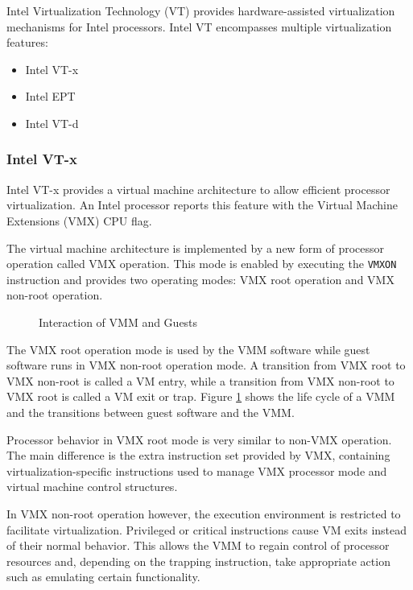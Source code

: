 Intel Virtualization Technology (VT) provides hardware-assisted
virtualization mechanisms for Intel processors. Intel VT encompasses multiple
virtualization features:
\begin{itemize}
	\item Intel VT-x
	\item Intel EPT
	\item Intel VT-d
\end{itemize}

\subsubsection{Intel VT-x}
Intel VT-x provides a virtual machine architecture to allow
efficient processor virtualization. An Intel processor reports this feature
with the Virtual Machine Extensions (VMX) CPU flag.

The virtual machine architecture is implemented by a new form of processor
operation called VMX operation. This mode is enabled by executing the
\texttt{VMXON} instruction and provides two operating modes: VMX
root operation and VMX non-root operation.

\begin{figure}[h]
	\centering
	
	\caption{Interaction of VMM and Guests}
	\label{fig:vmm-lifecycle}
\end{figure}

The VMX root operation mode is used by the VMM software while guest software
runs in VMX non-root operation mode. A transition from VMX root to VMX non-root
is called a VM entry, while a transition from VMX non-root to VMX root is called
a VM exit or trap. Figure \ref{fig:vmm-lifecycle} shows the life cycle of a VMM
and the transitions between guest software and the VMM.

Processor behavior in VMX root mode is very similar to non-VMX operation.  The
main difference is the extra instruction set provided by VMX, containing
virtualization-specific instructions used to manage VMX processor mode and
virtual machine control structures.

In VMX non-root operation however, the execution environment is restricted to
facilitate virtualization. Privileged or critical instructions cause VM exits
instead of their normal behavior. This allows the VMM to regain control of
processor resources and, depending on the trapping instruction, take
appropriate action such as emulating certain functionality.

